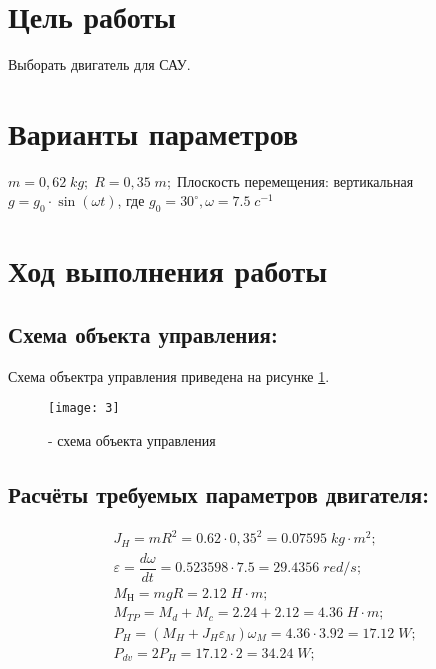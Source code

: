 







\section{Цель работы}
Выборать двигатель для САУ.


\section{Варианты параметров}

$m=0,62\;kg;\;R=0,35\;m;\;$Плоскость перемещения: вертикальная\\

$g=g_0\cdot \sin(\omega t)$, где $g_0=30^{\circ}, \omega=7.5\; c^{-1}$

\section{Ход выполнения работы}
\subsection{Схема объекта управления:}
Схема объектра управления приведена на рисунке \ref{pic:pic_1}.
\begin{figure}[H]
	\begin{center}
		\texttt{[image: 3]}
		\caption{- схема объекта управления} 
		\label{pic:pic_1} %
	\end{center}
\end{figure}

\subsection{Расчёты требуемых параметров двигателя:}
\begin{equation}
	\begin{split}
		&J_H=mR^2=0.62\cdot 0,35^2=0.07595\; kg\cdot m^2;\\
		&\varepsilon=\dfrac{d\omega}{dt}=0.523598\cdot 7.5 = 29.4356\; red/s;\\
		&M_{Н}= mgR =2.12\; H\cdot m;\\
		&M_{TP}= M_d+M_c = 2.24+2.12= 4.36\; H\cdot m;\\
		&P_H=\left( M_H+J_H \varepsilon_M \right)\omega_M= 4.36\cdot 3.92 =17.12\;W;\\
		&P_{dv}=2P_H=17.12\cdot 2=34.24\; W;\\
	\end{split}			
\end{equation}

